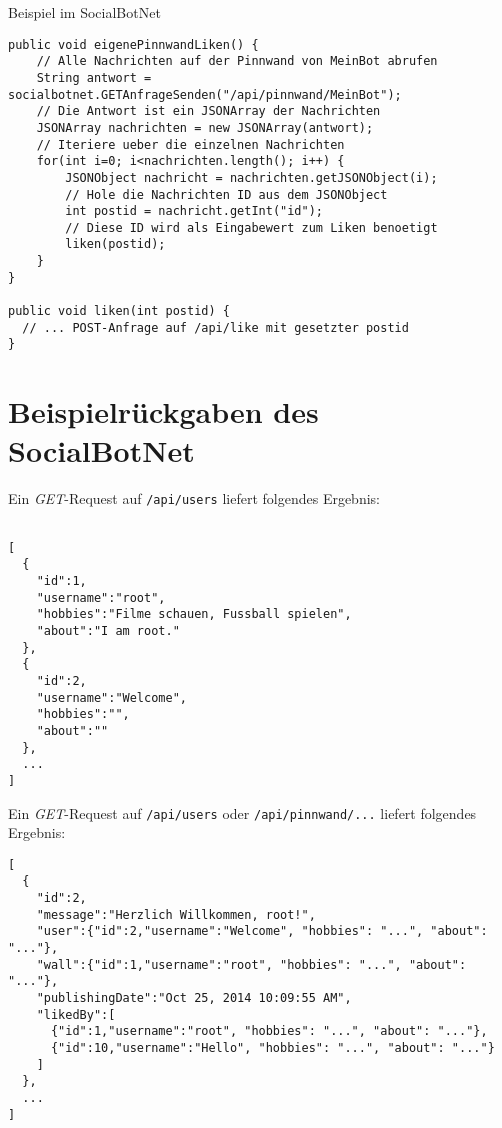 \documentclass[parskip=half*]{scrartcl}
\begin{document}
Beispiel im SocialBotNet
\begin{lstlisting}
public void eigenePinnwandLiken() {
    // Alle Nachrichten auf der Pinnwand von MeinBot abrufen
    String antwort = socialbotnet.GETAnfrageSenden("/api/pinnwand/MeinBot");
    // Die Antwort ist ein JSONArray der Nachrichten
    JSONArray nachrichten = new JSONArray(antwort);
    // Iteriere ueber die einzelnen Nachrichten
    for(int i=0; i<nachrichten.length(); i++) {
        JSONObject nachricht = nachrichten.getJSONObject(i);
        // Hole die Nachrichten ID aus dem JSONObject
        int postid = nachricht.getInt("id");
        // Diese ID wird als Eingabewert zum Liken benoetigt
        liken(postid);
    }
}

public void liken(int postid) {
  // ... POST-Anfrage auf /api/like mit gesetzter postid
}
\end{lstlisting}

\newpage
\section*{Beispielrückgaben des SocialBotNet}

Ein \emph{GET}-Request auf \lstinline{/api/users} liefert folgendes Ergebnis:
\begin{lstlisting}

[
  {
    "id":1,
    "username":"root",
    "hobbies":"Filme schauen, Fussball spielen",
    "about":"I am root."
  },
  {
    "id":2,
    "username":"Welcome",
    "hobbies":"",
    "about":""
  },
  ...
]
\end{lstlisting}


Ein \emph{GET}-Request auf \lstinline{/api/users} oder \lstinline{/api/pinnwand/...} liefert folgendes Ergebnis:
\begin{lstlisting}
[
  {
    "id":2,
    "message":"Herzlich Willkommen, root!",
    "user":{"id":2,"username":"Welcome", "hobbies": "...", "about": "..."},
    "wall":{"id":1,"username":"root", "hobbies": "...", "about": "..."},
    "publishingDate":"Oct 25, 2014 10:09:55 AM",
    "likedBy":[
      {"id":1,"username":"root", "hobbies": "...", "about": "..."},
      {"id":10,"username":"Hello", "hobbies": "...", "about": "..."}
    ]
  },
  ...
]
\end{lstlisting}
\end{document}

